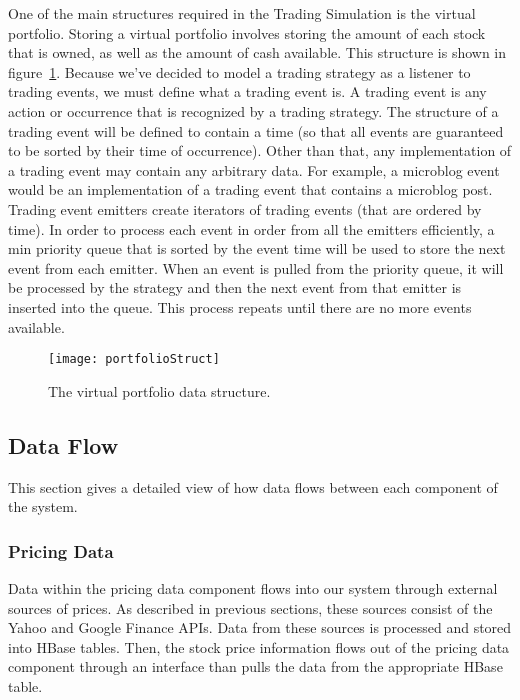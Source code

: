 One of the main structures required in the Trading Simulation is the virtual portfolio. Storing a virtual portfolio involves storing the amount of each stock that is owned, as well as the amount of cash available. This structure is shown in figure~\ref{portfolioStruct}. Because we've decided to model a trading strategy as a listener to trading events, we must define what a trading event is. A trading event is any action or occurrence that is recognized by a trading strategy. The structure of a trading event will be defined to contain a time (so that all events are guaranteed to be sorted by their time of occurrence). Other than that, any implementation of a trading event may contain any arbitrary data. For example, a microblog event would be an implementation of a trading event that contains a microblog post. Trading event emitters create iterators of trading events (that are ordered by time). In order to process each event in order from all the emitters efficiently, a min priority queue that is sorted by the event time will be used to store the next event from each emitter. When an event is pulled from the priority queue, it will be processed by the strategy and then the next event from that emitter is inserted into the queue. This process repeats until there are no more events available.

\begin{figure}[h]
  \label{portfolioStruct}
  \begin{center}
    \texttt{[image: portfolioStruct]}
  \end{center}
  \caption{The virtual portfolio data structure.}
\end{figure}

\subsection{Data Flow}

This section gives a detailed view of how data flows between each component of the system.

\subsubsection{Pricing Data}

Data within the pricing data component flows into our system through external sources of prices. As described in previous sections, these sources consist of the Yahoo and Google Finance APIs. Data from these sources is processed and stored into HBase tables. Then, the stock price information flows out of the pricing data component through an interface than pulls the data from the appropriate HBase table.

